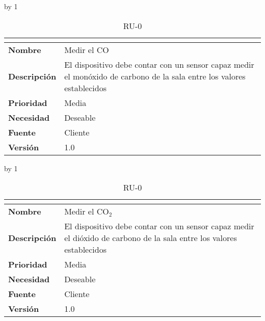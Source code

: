 \advance\ru by 1
\begin{table}[H]
	\caption{RU-0\number\ru}
	\begin{tabular}{|l|p{}|}
		\hline
		\multicolumn{2}{|c|}{\cellcolor[HTML]{BFBFBF}{\color[HTML]{000000} \textbf{RU-0\number\ru}}} \\ \hline
		\textbf{Nombre}      & Medir el CO                                                                                                           \\ \hline
		\textbf{Descripción} & El dispositivo debe contar con un sensor capaz medir el monóxido de carbono de la sala entre los valores establecidos \\ \hline
		\textbf{Prioridad}   & Media                                                                                                                 \\ \hline
		\textbf{Necesidad}   & Deseable                                                                                                              \\ \hline
		\textbf{Fuente}      & Cliente                                                                                                               \\ \hline
		\textbf{Versión}     & 1.0                                                                                                                   \\ \hline
	\end{tabular}
\end{table}
\advance\ru by 1
\begin{table}[H]
	\caption{RU-0\number\ru}
	\begin{tabular}{|l|p{}|}
		\hline
		\multicolumn{2}{|c|}{\cellcolor[HTML]{BFBFBF}{\color[HTML]{000000} \textbf{RU-0\number\ru}}} \\ \hline
		\textbf{Nombre}      & Medir el CO$_2$                                                                                                      \\ \hline
		\textbf{Descripción} & El dispositivo debe contar con un sensor capaz medir el dióxido de carbono de la sala entre los valores establecidos \\ \hline
		\textbf{Prioridad}   & Media                                                                                                                \\ \hline
		\textbf{Necesidad}   & Deseable                                                                                                             \\ \hline
		\textbf{Fuente}      & Cliente                                                                                                              \\ \hline
		\textbf{Versión}     & 1.0                                                                                                                  \\ \hline
	\end{tabular}
\end{table}

